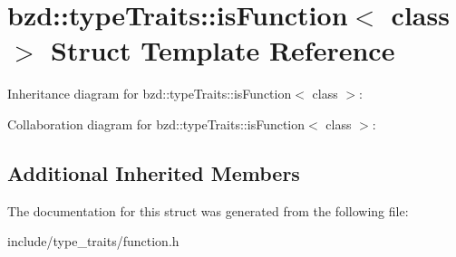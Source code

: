 \hypertarget{structbzd_1_1typeTraits_1_1isFunction}{}\section{bzd\+:\+:type\+Traits\+:\+:is\+Function$<$ class $>$ Struct Template Reference}
\label{structbzd_1_1typeTraits_1_1isFunction}


Inheritance diagram for bzd\+:\+:type\+Traits\+:\+:is\+Function$<$ class $>$\+:


Collaboration diagram for bzd\+:\+:type\+Traits\+:\+:is\+Function$<$ class $>$\+:
\subsection*{Additional Inherited Members}


The documentation for this struct was generated from the following file\+:\begin{DoxyCompactItemize}
\item 
include/type\+\_\+traits/function.\+h\end{DoxyCompactItemize}
